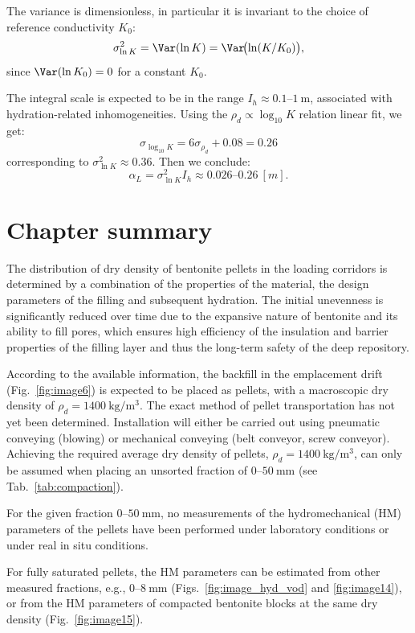 The variance is dimensionless, in particular it is invariant to
the choice of reference conductivity $K_0$:
\[
 \sigma_{\ln K}^2=\Var(\ln K)=\Var\!\bigl(\ln(K/K_0)\bigr),
\]
since $\Var(\ln K_0)=0$ for a constant $K_0$.

The integral scale is expected to be in the range $I_h \approx 0.1$--$1~\mathrm{m}$, associated with
hydration-related inhomogeneities. Using the $\rho_d  \propto \log_{10} K$ relation linear fit, we get:
\[
\sigma_{\log_{10}K} = 6 \sigma_{\rho_d} + 0.08 = 0.26
\]
corresponding to  $\sigma^2_{\ln K}\approx 0.36$.
Then we conclude:
\[
\alpha_L = \sigma_{\ln K}^2 I_h \approx 0.026\text{--}0.26~[m].
\]





\section{Chapter summary}
\label{sec_conclusion}


The distribution of dry density of bentonite pellets in the loading corridors is determined by a combination of the properties of the material, the design parameters of the filling and subsequent hydration. The initial unevenness is significantly reduced over time due to the expansive nature of bentonite and its ability to fill pores, which ensures high efficiency of the insulation and barrier properties of the filling layer and thus the long-term safety of the deep repository.


According to the available information, the backfill in the emplacement drift (Fig.~\ref{fig:image6}) is expected to be placed as pellets, with a macroscopic dry density of $\rho_d = 1400~\mathrm{kg/m^3}$.
The exact method of pellet transportation has not yet been determined. Installation will either be carried out using pneumatic conveying (blowing) or mechanical conveying (belt conveyor, screw conveyor). Achieving the required average dry density of pellets, 
$\rho_d = 1400 \ \mathrm{kg/m^3}$,
can only be assumed when placing an unsorted fraction of \(0\text{–}50 \ \mathrm{mm}\) 
(see Tab.~\ref{tab:compaction}).

For the given fraction \(0\text{–}50 \ \mathrm{mm}\), no measurements of the hydromechanical (HM) parameters of the pellets have been performed under laboratory conditions or under real in situ conditions.

For fully saturated pellets, the HM parameters can be estimated from other measured fractions, e.g., \(0\text{–}8 \ \mathrm{mm}\) (Figs.~\ref{fig:image_hyd_vod} and \ref{fig:image14}), or from the HM parameters of compacted bentonite blocks at the same dry density (Fig.~\ref{fig:image15}).


